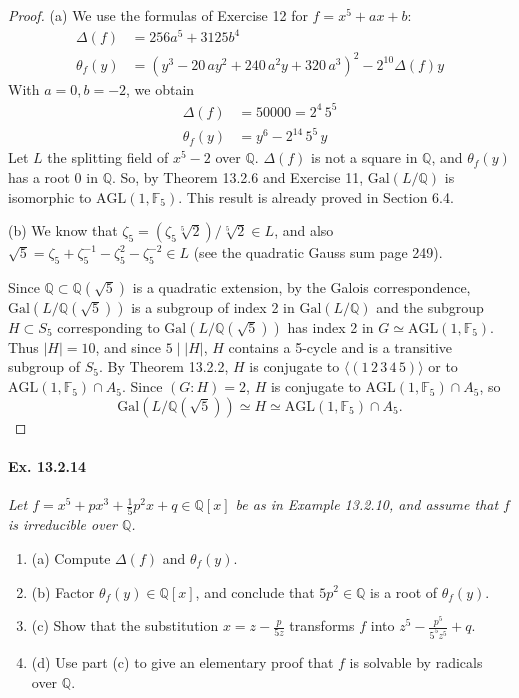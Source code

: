 \documentclass[11pt,a4paper]{article}
\newcommand{\be} {\begin{enumerate}}
\newcommand{\ee} {\end{enumerate}}
\newcommand{\Q}{\mathbb{Q}}
\newcommand{\F}{\mathbb{F}}
\newcommand{\Gal}{\mathrm{Gal}}
\begin{document}
\begin{proof}
\item[(a)] We use the formulas of Exercise 12 for $f =x^5+ax+b$:
\begin{align*}
\Delta(f) &= 256a^5+3125b^4\\
\theta_f(y) &=  {\left(y^{3} - 20 \, a y^{2}  + 240 \,a^{2} y + 320 \, a^{3} \right)}^{2} - 2^{10}\Delta(f) y
\end{align*}
With $a=0, b=-2$, we obtain
\begin{align*}
\Delta(f) &= 50000= 2^4\,  5^5\\
\theta_f(y) &=  y^6- 2^{14}\, 5^5\, y
\end{align*}
Let $L$ the splitting field of $x^5 - 2$ over $\Q$.
 $\Delta(f)$ is not a square in $\mathbb{Q}$, and $\theta_f(y)$ has a root 0 in $\Q$. So, by Theorem 13.2.6 and Exercise 11, $\Gal(L/\Q)$ is isomorphic to $\mathrm{AGL}(1,\F_5)$. This result is  already proved in Section 6.4.
 
 \item[(b)] 
  We know that $\zeta_5 = (\zeta_5 \sqrt[5]{2})/ \sqrt[5]{2} \in L$, and also $\sqrt{5} = \zeta_5 + \zeta_5^{-1} - \zeta_5^2 - \zeta_5^{-2} \in L$ (see the quadratic Gauss sum page 249).
  
 Since $\Q \subset \Q(\sqrt{5})$ is a quadratic extension, by the Galois correspondence, $\Gal(L / \Q(\sqrt{5}))$ is a subgroup of index 2 in $\Gal(L/\Q)$ and the subgroup $H \subset S_5$ corresponding to $\Gal(L/\Q(\sqrt{5}))$ has index 2 in $G \simeq \mathrm{AGL}(1,\F_5)$. Thus $|H| = 10$, and since $5 \mid |H|$, $H$ contains a 5-cycle and is a transitive subgroup of $S_5$.  By Theorem 13.2.2, $H$ is conjugate to $\langle (1\,2\,3\,4\,5) \rangle$ or to $ \mathrm{AGL}(1,\F_5) \cap A_5$. Since $(G:H) = 2$, $H$ is conjugate to  $\mathrm{AGL}(1,\F_5) \cap A_5$, so
 $$\Gal(L/\Q(\sqrt{5})) \simeq H \simeq \mathrm{AGL}(1,\F_5) \cap A_5.$$
 
\end{proof}

\paragraph{Ex. 13.2.14}

{\it Let $f = x^5 + px^3 +\frac{1}{5} p^2x + q \in \Q[x]$ be as in Example 13.2.10, and assume that $f$ is irreducible over $\Q$.
\be
\item[(a)] Compute $\Delta(f)$ and $\theta_f(y)$.
\item[(b)] Factor $\theta_f(y) \in \Q[x]$, and conclude that $5p^2 \in \Q$ is a root of $\theta_f(y)$.
\item[(c)] Show that the substitution $x = z - \frac{p}{5z}$ transforms $f$ into $z^5 - \frac{p^5}{5^5z^5} + q$.
\item[(d)] Use part (c) to give an elementary proof that $f$ is solvable by radicals over $\Q$.
\ee
}
\end{document}
